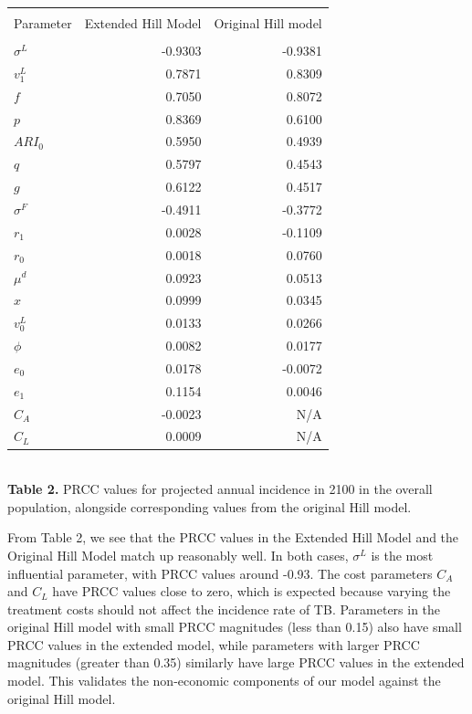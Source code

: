 \documentclass{amsart}
\begin{document}
\begin{table}[h]
\centering
\begin{tabular}{l r r}
\hline\hline\\
Parameter & Extended Hill Model & Original Hill model \\ [0.5ex]
\hline\\
$\sigma^{L}$  & -0.9303 & -0.9381 \\
$v^{L}_{1}$   & 0.7871  & 0.8309 \\
$f$                 & 0.7050  & 0.8072 \\
$p$                & 0.8369  & 0.6100 \\
$ARI_{0}$      & 0.5950  & 0.4939 \\
$q$                & 0.5797  & 0.4543 \\
$g$                & 0.6122  & 0.4517 \\
$\sigma^{F}$ & -0.4911 & -0.3772 \\
$r_{1}$          & 0.0028  & -0.1109 \\
$r_{0}$          & 0.0018  & 0.0760 \\
$\mu^{d}$      & 0.0923 & 0.0513 \\
$x$                 & 0.0999 & 0.0345 \\
$v^{L}_{0}$    & 0.0133 & 0.0266 \\
$\phi$             & 0.0082 & 0.0177 \\
$e_{0}$          & 0.0178 & -0.0072 \\
$e_{1}$          & 0.1154 & 0.0046 \\
$C_{A}$          & -0.0023 & N/A \\
$C_{L}$           & 0.0009 & N/A \\ [1ex]
\hline
\end{tabular}\\[1ex]

{\bf Table 2.} PRCC values for projected annual incidence in 2100
 in the overall population, alongside corresponding values from the
original Hill model.
\end{table}

From Table 2, we see that the PRCC values in the Extended Hill Model and the
Original Hill Model match up reasonably well.  In both cases, $\sigma^{L}$ is
the most influential parameter, with PRCC values around -0.93.  The cost
parameters $C_{A}$ and $C_{L}$ have PRCC values close to zero, which is expected
because varying the treatment costs should not affect the incidence rate of TB.
Parameters in the original Hill model with small PRCC magnitudes (less than
0.15) also have small PRCC values in the extended model, while parameters with
larger PRCC magnitudes (greater than 0.35) similarly have large PRCC values in
the extended model.  This validates the non-economic components of our model
against the original Hill model.   \\
\end{document}
